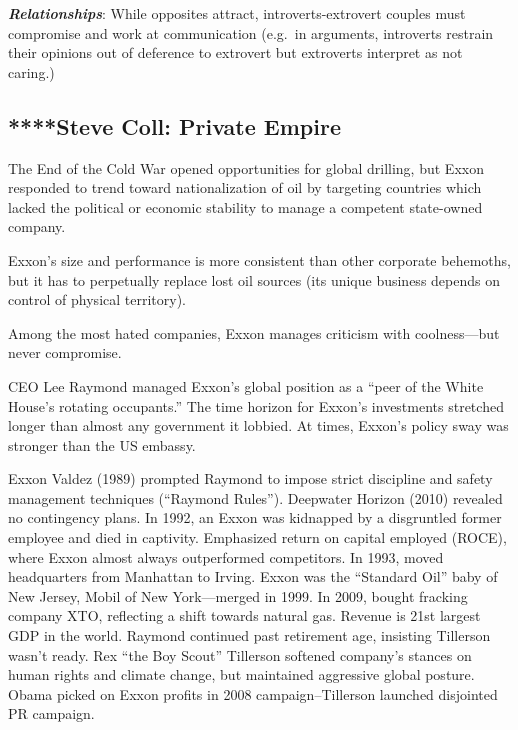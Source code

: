 \documentclass[
]{article}
\begin{document}
\textbf{\emph{Relationships}}: While opposites attract,
introverts-extrovert couples must compromise and work at communication
(e.g.~in arguments, introverts restrain their opinions out of deference
to extrovert but extroverts interpret as not caring.)

\hypertarget{steve-coll-private-empire}{%
\subsection{****Steve Coll: Private
Empire}\label{steve-coll-private-empire}}

The End of the Cold War opened opportunities for global drilling, but
Exxon responded to trend toward nationalization of oil by targeting
countries which lacked the political or economic stability to manage a
competent state-owned company.

Exxon's size and performance is more consistent than other corporate
behemoths, but it has to perpetually replace lost oil sources (its
unique business depends on control of physical territory).

Among the most hated companies, Exxon manages criticism with
coolness---but never compromise.

CEO Lee Raymond managed Exxon's global position as a ``peer of the White
House's rotating occupants.'' The time horizon for Exxon's investments
stretched longer than almost any government it lobbied. At times,
Exxon's policy sway was stronger than the US embassy.

Exxon Valdez (1989) prompted Raymond to impose strict discipline and
safety management techniques (``Raymond Rules''). Deepwater Horizon
(2010) revealed no contingency plans. In 1992, an Exxon was kidnapped by
a disgruntled former employee and died in captivity. Emphasized return
on capital employed (ROCE), where Exxon almost always outperformed
competitors. In 1993, moved headquarters from Manhattan to Irving. Exxon
was the ``Standard Oil'' baby of New Jersey, Mobil of New York---merged
in 1999. In 2009, bought fracking company XTO, reflecting a shift
towards natural gas. Revenue is 21st largest GDP in the world. Raymond
continued past retirement age, insisting Tillerson wasn't ready. Rex
``the Boy Scout'' Tillerson softened company's stances on human rights
and climate change, but maintained aggressive global posture. Obama
picked on Exxon profits in 2008 campaign--Tillerson launched disjointed
PR campaign.
\end{document}
